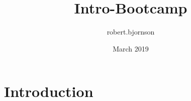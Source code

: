 \documentclass{article}
\title{Intro-Bootcamp}
\author{robert.bjornson }
\date{March 2019}
\begin{document}
\maketitle

\section{Introduction}
\end{document}
